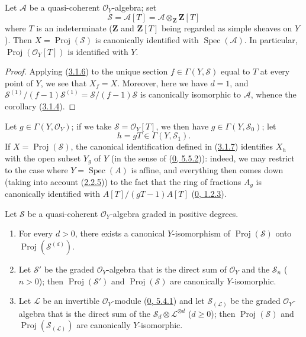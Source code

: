 \begin{corollary}[3.1.7]
\label{II.3.1.7}
Let $\mathcal{A}$ be a quasi-coherent $\mathcal{O}_Y$-algebra; set
\[
  \mathcal{S}=\mathcal{A}[T]
  =\mathcal{A}\otimes_{\mathbf{Z}}\mathbf{Z}[T]
\]
where $T$ is an indeterminate ($\mathbf{Z}$ and $\mathbf{Z}[T]$ being
regarded as simple sheaves on $Y$). Then
$X=\operatorname{Proj}(\mathcal{S})$ is canonically identified with
$\operatorname{Spec}(\mathcal{A})$. In particular,
$\operatorname{Proj}(\mathcal{O}_Y[T])$ is identified with $Y$.
\end{corollary}

\begin{proof}
Applying (\hyperref[II.3.1.6]{3.1.6}) to the unique section
$f\in\Gamma(Y,\mathcal{S})$ equal to $T$ at every point of $Y$, we see that
$X_f=X$. Moreover, here we have $d=1$, and
$\mathcal{S}^{(1)}/(f-1)\mathcal{S}^{(1)}
=\mathcal{S}/(f-1)\mathcal{S}$ is canonically isomorphic to $\mathcal{A}$,
whence the corollary (\hyperref[II.3.1.4]{3.1.4}).
\end{proof}

Let $g\in\Gamma(Y,\mathcal{O}_Y)$; if we take
$\mathcal{S}=\mathcal{O}_Y[T]$, we then have $g\in\Gamma(Y,\mathcal{S}_0)$; let
\[
  h=gT\in\Gamma(Y,\mathcal{S}_1).
\]
If $X=\operatorname{Proj}(\mathcal{S})$, the canonical identification defined
in (\hyperref[II.3.1.7]{3.1.7}) identifies $X_h$ with the open subset
$Y_g$ of $Y$ (in the sense of (\hyperref[0.5.5.2]{0, 5.5.2})): indeed, we
may restrict to the case where $Y=\operatorname{Spec}(A)$ is affine, and
everything then comes down (taking into account
(\hyperref[II.2.2.5]{2.2.5})) to the fact that the ring of fractions $A_g$
is canonically identified with $A[T]/(gT-1)A[T]$
(\hyperref[0.1.2.3]{0, 1.2.3}).

\begin{proposition}[3.1.8]
\label{II.3.1.8}
Let $\mathcal{S}$ be a quasi-coherent $\mathcal{O}_Y$-algebra graded in
positive degrees.
\begin{enumerate}
  \item[\rm(i)] For every $d>0$, there exists a canonical $Y$-isomorphism of
    $\operatorname{Proj}(\mathcal{S})$ onto
    $\operatorname{Proj}(\mathcal{S}^{(d)})$.


  \item[\rm(ii)] Let $\mathcal{S}'$ be the graded $\mathcal{O}_Y$-algebra that
    is the direct sum of $\mathcal{O}_Y$ and the $\mathcal{S}_n$ ($n>0$);
    then $\operatorname{Proj}(\mathcal{S}')$ and
    $\operatorname{Proj}(\mathcal{S})$ are canonically $Y$-isomorphic.
  \item[\rm(iii)] Let $\mathcal{L}$ be an invertible $\mathcal{O}_Y$-module
    (\hyperref[0.5.4.1]{0, 5.4.1}) and let $\mathcal{S}_{(\mathcal{L})}$
    be the graded $\mathcal{O}_Y$-algebra that is the direct sum of the
    $\mathcal{S}_d\otimes\mathcal{L}^{\otimes d}$ ($d\geq0$); then
    $\operatorname{Proj}(\mathcal{S})$ and
    $\operatorname{Proj}(\mathcal{S}_{(\mathcal{L})})$ are canonically
    $Y$-isomorphic.
\end{enumerate}
\end{proposition}


